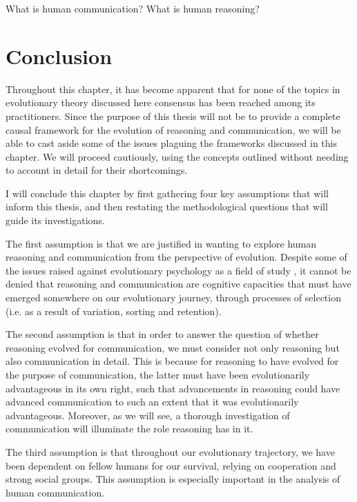 \begin{exe}
    \ex
    \begin{xlist}
        \ex What is human communication?
        \ex What is human reasoning?
    \end{xlist}
\end{exe}

\section{Conclusion}
\label{sec:evo-conclusion}
Throughout this chapter, it has become apparent that for none of the topics in evolutionary theory discussed here consensus has been reached among its practitioners. Since the purpose of this thesis will not be to provide a complete causal framework for the evolution of reasoning and communication, we will be able to cast aside some of the issues plaguing the frameworks discussed in this chapter. We will proceed cautiously, using the concepts outlined without needing to account in detail for their shortcomings.

I will conclude this chapter by first gathering four key assumptions that will inform this thesis, and then restating the methodological questions that will guide its investigations.

The first assumption is that we are justified in wanting to explore human reasoning and communication from the perspective of evolution. Despite some of the issues raised against evolutionary psychology as a field of study \citep{LB02}, it cannot be denied that reasoning and communication are cognitive capacities that must have emerged somewhere on our evolutionary journey, through processes of selection (i.e. as a result of variation, sorting and retention).

The second assumption is that in order to answer the question of whether reasoning evolved for communication, we must consider not only reasoning but also communication in detail. This is because for reasoning to have evolved for the purpose of communication, the latter must have been evolutionarily advantageous in its own right, such that advancements in reasoning could have advanced communication to such an extent that it was evolutionarily advantageous.
Moreover, as we will see, a thorough investigation of communication will illuminate the role reasoning has in it.

The third assumption is that throughout our evolutionary trajectory, we have been dependent on fellow humans for our survival, relying on cooperation and strong social groups. This assumption is especially important in the analysis of human communication.

